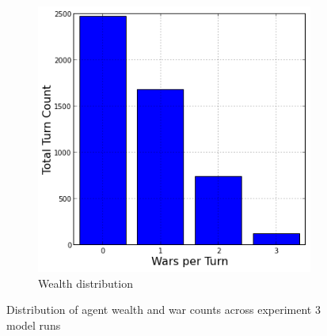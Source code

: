 \documentclass{article}
\begin{document}
\begin{figure}[h!]
\begin{subfigure}{0.49\textwidth}
		\includegraphics[width=\textwidth]{Graphics/Exp3WarDistribution}
		\caption{Wealth distribution}
	\end{subfigure}
\caption{Distribution of agent wealth and war counts across experiment 3 model runs}
\end{figure}
\end{document}

